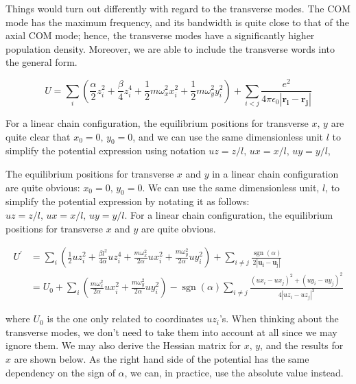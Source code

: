 Things would turn out differently with regard to the transverse modes. The COM mode has the maximum frequency, and its bandwidth is quite close to that of the axial COM mode; hence, the transverse modes have a significantly higher population density. Moreover, we are able to include the transverse words into the general form.

\begin{equation}
    U=\sum_i\left(\frac{\alpha}{2} z_i^2+\frac{\beta}{4} z_i^4+\frac{1}{2} m \omega_x^2 x_i^2+\frac{1}{2} m \omega_y^2 y_i^2\right)+\sum_{i<j} \frac{e^2}{4 \pi \epsilon_0\left|\mathbf{r}_{\mathbf{i}}-\mathbf{r}_{\mathbf{j}}\right|}
\end{equation}

For a linear chain configuration, the equilibrium positions for transverse \(x,\, y\) are quite clear that \(x_0=0,\,y_0=0\), and we can use the same dimensionless unit \(l\) to simplify the potential expression using notation \(uz=z/l,\, ux=x/l,\, uy=y/l\),

The equilibrium positions for transverse \(x\) and \(y\) in a linear chain configuration are quite obvious: \(x_0=0,\,y_0=0\). We can use the same dimensionless unit, \(l\), to simplify the potential expression by notating it as follows: \(uz=z/l,\, ux=x/l,\, uy=y/l\). For a linear chain configuration, the equilibrium positions for transverse \(x\) and \(y\) are quite obvious.

\begin{equation}
    \begin{aligned}
        U^{\prime} & =\sum_i\left(\frac{1}{2} u z_i^2+\frac{\beta l^2}{4 \alpha} u z_i^4+\frac{m \omega_x^2}{2 \alpha} u x_i^2+\frac{m \omega_y^2}{2 \alpha} u y_i^2\right)+\sum_{i \neq j} \frac{\operatorname{sgn}(\alpha)}{2\left|\mathbf{u}_{\mathbf{i}}-\mathbf{u}_{\mathrm{j}}\right|} \\
                   & =U_0+\sum_i\left(\frac{m \omega_x^2}{2 \alpha} u x_i^2+\frac{m \omega_y^2}{2 \alpha} u y_i^2\right)-\operatorname{sgn}(\alpha) \sum_{i \neq j} \frac{\left(u x_i-u x_j\right)^2+\left(u y_i-u y_j\right)^2}{4\left|u z_i-u z_j\right|^3}
    \end{aligned}
\end{equation}

where \(U_0\) is the one only related to coordinates \(uz_i\)'s. When thinking about the transverse modes, we don't need to take them into account at all since we may ignore them. We may also derive the Hessian matrix for \(x,\, y\), and the results for \(x\) are shown below. As the right hand side of the potential has the same dependency on the sign of \(\alpha\), we can, in practice, use the absolute value instead.

